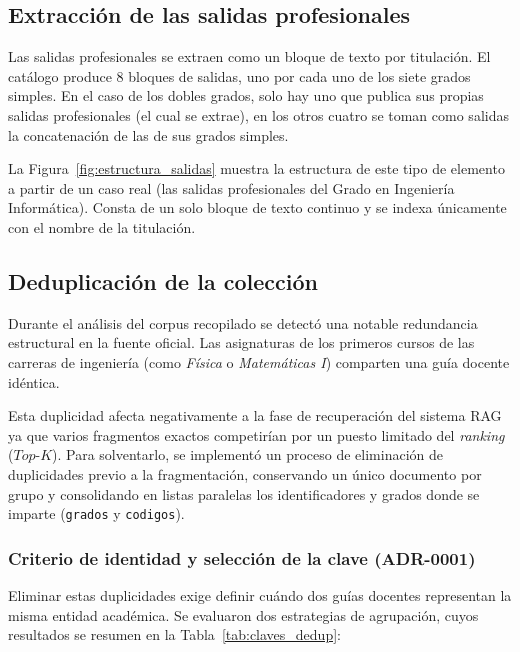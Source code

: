 


\subsection{Extracción de las salidas profesionales}

Las salidas profesionales se extraen como un bloque de texto por titulación. El catálogo produce 8 bloques de salidas,
uno por cada uno de los siete grados simples. En el caso de los dobles grados, solo hay uno que publica sus propias salidas profesionales (el cual se extrae), en los otros cuatro se toman como salidas la concatenación de las de sus grados simples.


  La Figura~\ref{fig:estructura_salidas} muestra la estructura de este tipo de elemento a partir de un caso real (las salidas profesionales del Grado en Ingeniería Informática). Consta de un solo bloque de texto continuo y se indexa únicamente con el nombre de la titulación.



\subsection[Deduplicación de la colección]{Deduplicación de la colección}
\label{subsec:deduplicacion}

Durante el análisis del corpus recopilado se detectó una notable redundancia estructural en la fuente oficial. Las asignaturas de los primeros cursos de las carreras de ingeniería (como \textit{Física} o \textit{Matemáticas I}) comparten una guía docente idéntica.

Esta duplicidad afecta negativamente a la fase de recuperación del sistema RAG ya que varios fragmentos exactos competirían por un puesto limitado del \textit{ranking} ($Top\text{-}K$). Para solventarlo, se implementó un proceso de eliminación de duplicidades previo a la fragmentación, conservando un único documento por grupo y consolidando en listas paralelas los identificadores y grados donde se imparte (\texttt{grados} y \texttt{codigos}).

\subsubsection{Criterio de identidad y selección de la clave (ADR-0001)}
\label{secc:criterio_identidad_deduplicacion}

Eliminar estas duplicidades exige definir cuándo dos guías docentes representan la misma entidad académica. Se evaluaron dos estrategias de agrupación, cuyos resultados se resumen en la Tabla~\ref{tab:claves_dedup}:

